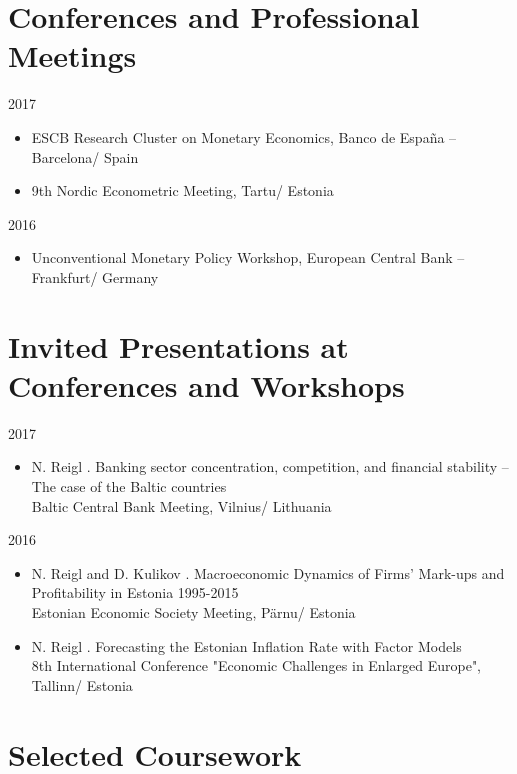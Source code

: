 \documentclass[11pt,letter,sans]{moderncv}
\begin{document}
\section{Conferences and Professional Meetings}
2017
\begin{itemize}
  \item ESCB Research Cluster on Monetary Economics, Banco de España -- Barcelona/ Spain
  \item 9th Nordic Econometric Meeting, Tartu/ Estonia
\end{itemize}
2016
\begin{itemize}
  \item Unconventional Monetary Policy Workshop, European Central Bank -- Frankfurt/ Germany
\end{itemize}


\section{Invited Presentations at Conferences and Workshops}
2017
\begin{itemize}
  \item N. Reigl . Banking sector concentration, competition, and financial stability -- The case of the Baltic countries \\
  Baltic Central Bank Meeting, Vilnius/ Lithuania
\end{itemize}2016
\begin{itemize}
  \item N. Reigl and D. Kulikov . Macroeconomic Dynamics of Firms' Mark-ups and Profitability in Estonia 1995-2015 \\
  Estonian Economic Society Meeting, Pärnu/ Estonia
\end{itemize}
\begin{itemize}
  \item N. Reigl . Forecasting the Estonian Inflation Rate with Factor Models \\
  8th International Conference "Economic Challenges in Enlarged Europe", Tallinn/ Estonia
\end{itemize}


\section{Selected Coursework}
\end{document}
